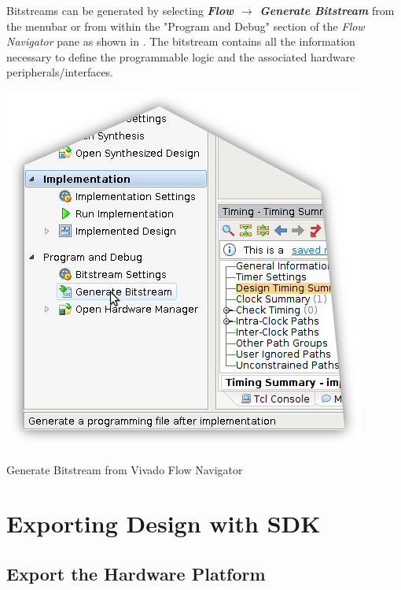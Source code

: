 Bitstreams can be generated by selecting \textit{\bfseries Flow $\rightarrow$ Generate Bitstream} from the menubar or from within the "Program and Debug" section of the \textit{Flow Navigator} pane as shown in . The bitstream contains all the information necessary to define the programmable logic and the associated hardware peripherals/interfaces.

\begin{marginfigure}
	\centering
	\includegraphics{images/Generate_Bitstream.png}
	\caption[Generate Bitstream from Vivado Flow Navigator]{Generate Bitstream from Vivado Flow Navigator}
	\label{fig:genbitstream}
\end{marginfigure}





\section{Exporting Design with SDK}

\subsection{Export the Hardware Platform}

